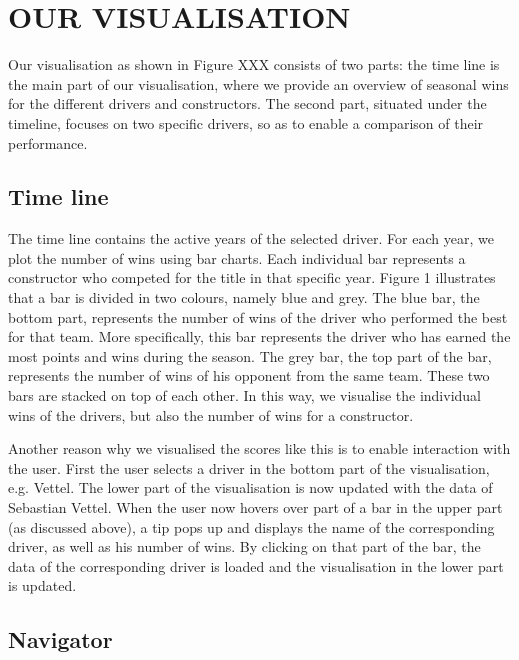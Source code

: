 \documentclass{sigchi}
\begin{document}
\section{OUR VISUALISATION}
Our visualisation as shown in Figure XXX consists of two parts: the time line is the main part of our visualisation, where we provide an overview of seasonal wins for the different drivers and constructors. The second part, situated under the timeline, focuses on two specific drivers, so as to enable a comparison of their performance. 

\subsection{Time line}

The time line contains the active years of the selected driver. For each year, we plot the number of wins using bar charts. Each individual bar represents a constructor who competed for the title in that specific year. Figure 1 illustrates that a bar is divided in two colours, namely blue and grey. The blue bar, the bottom part, represents the number of wins of the driver who performed the best for that team. More specifically, this bar represents the driver who has earned the most points and wins  during the season. The grey bar, the top part of the bar, represents the number of wins of his opponent from the same team. These two bars are stacked on top of each other. In this way, we visualise the individual wins of the drivers, but also the number of wins for a constructor.

Another reason why we visualised the scores like this is to enable interaction with the user. First the user selects a driver in the bottom part of the visualisation, e.g. Vettel. The lower part of the visualisation is now updated with the data of Sebastian Vettel. When the user now hovers over part of a bar in the upper part (as discussed above), a tip pops up and displays the name of the corresponding driver, as well as his number of wins. By clicking on that part of the bar, the data of the corresponding driver is loaded and the visualisation in the lower part is updated. 


\subsection{Navigator}
\end{document}
